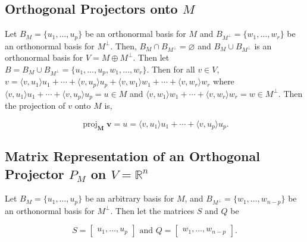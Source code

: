 \documentclass[12pt]{article}
\DeclareMathOperator{\proj}{proj}
\newcommand{\vct}{\mathbf}
\newcommand{\vctproj}[2][]{\proj_{\vct{#1}}\vct{#2}}
\theoremstyle{definition}
\begin{document}
\subsection{Orthogonal Projectors onto $M$}

Let $B_M = \{ u_1, \ldots, u_p \}$ be an orthonormal basis for $M$ and 
$B_{M^{\perp}} = \{ w_1, \ldots, w_r \}$ be an orthonormal basis for $M^{\perp}$. Then,
$B_M \cap B_{M^{\perp}} = \varnothing$ and $B_M \cup B_{M^{\perp}}$ is an
orthonormal basis for $V = M \oplus M^{\perp}$. Then let 
$B = B_M \cup B_{M^{\perp}} = \{ u_1, \ldots , u_p, w_1, \ldots, w_r\}$. Then for all
$v \in V$, $v = \langle v, u_1 \rangle u_1 + \cdots + \langle v, u_p \rangle u_p +
\langle v, w_1 \rangle w_1 + \cdots + \langle v, w_r \rangle w_r $ where
$\langle v, u_1 \rangle u_1 + \cdots + \langle v, u_p \rangle u_p = u \in M$ and
$\langle v, w_1 \rangle w_1 + \cdots + \langle v, w_r \rangle w_r = w \in M^{\perp}$.
Then the projection of $v$ onto $M$ is,

\[ \vctproj[M]{v} = u = \langle v, u_1 \rangle u_1 + \cdots + \langle v, u_p \rangle u_p.
\]

\subsection{Matrix Representation of an Orthogonal Projector $P_M$ on $V = \mathbb{R}^n$}

Let $B_M = \{ u_1, \ldots, u_p \}$ be an arbitrary basis for $M$, and 
$B_{M^{\perp}} = \{ w_1, \ldots, w_{n - p} \}$ be an orthonormal basis for $M^{\perp}$.
Then let the matrices $S$ and $Q$ be

\[ S = \begin{bmatrix} u_1, \ldots, u_p \end{bmatrix} \text{ and }
Q = \begin{bmatrix} w_1, \ldots, w_{n - p} \end{bmatrix}.
\]
\end{document}
